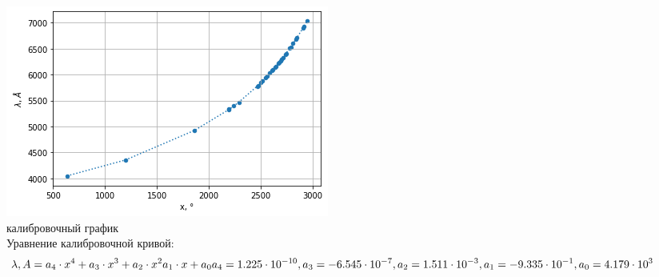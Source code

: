 \documentclass[a4paper,12pt]{article} %
\begin{document}
\begin{figure} 
\vspace{-40ex}
\includegraphics[width=\linewidth]{калибр.png}
\caption{ \centering калибровочный график\\ Уравнение калибровочной кривой:
\begin{equation*}
    \lambda, A  =  a_4 \cdot x^4 + a_3 \cdot x^3 + a_2  \cdot x^2  a_1 \cdot x + a_0\\
    a_4 = 1.225 \cdot 10^{-10}, a_3 = -6.545 \cdot 10^{-7}, a_2 = 1.511 \cdot 10^{-3}, \\ a_1 = - 9.335 \cdot 10^{-1}, a_0 = 4.179\cdot 10^{3}
\end{equation*}}
\label{fig:somelabel}
\end{figure}
\end{document}
